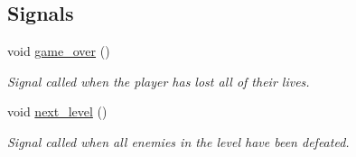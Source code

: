 \subsection*{Signals}
\begin{DoxyCompactItemize}
\item 
void \hyperlink{classlevel3_a66c2c618d5faf6c54ab1e88d88496c19}{game\+\_\+over} ()\hypertarget{classlevel3_a66c2c618d5faf6c54ab1e88d88496c19}{}\label{classlevel3_a66c2c618d5faf6c54ab1e88d88496c19}

\begin{DoxyCompactList}\small\item\em Signal called when the player has lost all of their lives. \end{DoxyCompactList}\item 
void \hyperlink{classlevel3_a40dafa1371eb8b9f736cfa94d4d7fde6}{next\+\_\+level} ()\hypertarget{classlevel3_a40dafa1371eb8b9f736cfa94d4d7fde6}{}\label{classlevel3_a40dafa1371eb8b9f736cfa94d4d7fde6}

\begin{DoxyCompactList}\small\item\em Signal called when all enemies in the level have been defeated. \end{DoxyCompactList}\end{DoxyCompactItemize}
